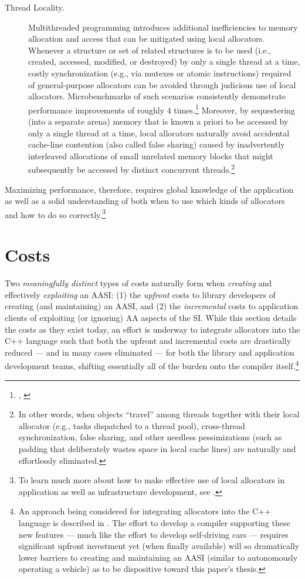 \begin{description}
\item[Thread Locality.] Multithreaded programming introduces additional
inefficiencies to memory allocation and access that can be mitigated using
local allocators. Whenever a structure or set of related structures is to be used
(i.e., created, accessed, modified, or destroyed) by only a single thread at a
time, costly synchronization (e.g., via mutexes or atomic instructions) required
of general-purpose allocators can be avoided through judicious use of local
allocators. Microbenchmarks of such scenarios consistently demonstrate
performance improvements of roughly 4 times.\footnote{\cite{bleaney16}, \cite{lakos16}}
Moreover, by sequestering
(into a separate arena) memory that is known a priori to be accessed by only a
single thread at a time, local allocators naturally avoid accidental cache-line
contention (also called false sharing) caused by inadvertently interleaved
allocations of small unrelated memory blocks that might subsequently be
accessed by distinct concurrent threads.\footnote{
In other words, when objects “travel” among threads together with their local allocator (e.g.,
tasks dispatched to a thread pool), cross-thread synchronization, false sharing, and other needless
pessimizations (such as padding that deliberately wastes space in local cache lines) are naturally and
effortlessly eliminated.}

\end{description}

Maximizing performance, therefore, requires global knowledge of the application as
well as a solid understanding of both when to use which kinds of allocators and how
to do so correctly.\footnote{To learn much more about how to make effective use of local allocators in application as well as
  infrastructure development, see \cite{halpern20a}.}

\section{Costs}

Two \emph{meaningfully distinct} types of costs naturally form when \emph{creating} and effectively
\emph{exploiting} an AASI: (1) the \emph{upfront} costs to library developers of creating (and
maintaining) an AASI, and (2) the \emph{incremental} costs to application clients of
exploiting (or ignoring) AA aspects of the SI. While this section details the costs as
they exist today, an effort is underway to integrate allocators into the C++ language
such that both the upfront and incremental costs are drastically reduced — and in
many cases eliminated — for both the library and application development teams,
shifting essentially all of the burden onto the compiler itself.\footnote{An approach
being considered for integrating allocators into the C++ language is described in
\cite{meredith19}. The effort to develop a compiler supporting these new features — much like the effort to
develop self-driving cars — requires significant upfront investment yet (when finally available) will so
dramatically lower barriers to creating and maintaining an AASI (similar to autonomously operating a
vehicle) as to be dispositive toward this paper’s thesis.}

